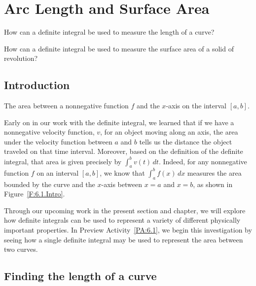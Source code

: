 \section{Arc Length and Surface Area} \label{S:6.3.ArcLength}

\begin{goals}
\item How can a definite integral be used to measure the length of a curve?
\item How can a definite integral be used to measure the surface area of a solid of revolution?
\end{goals}

\subsection*{Introduction}

\begin{marginfigure}[6cm] %
\caption{The area between a nonnegative function $f$ and the $x$-axis on the interval $[a,b]$.} \label{F:6.1.Intro}
\end{marginfigure}

Early on in our work with the definite integral, we learned that if we have a nonnegative velocity function, $v$, for an object moving along an axis, the area under the velocity function between $a$ and $b$ tells us the distance the object traveled on that time interval.  Moreover, based on the definition of the definite integral, that area is given precisely by $\int_a^b v(t) \, dt$.  Indeed, for any nonnegative function $f$ on an interval $[a,b]$, we know that $\int_a^b f(x) \, dx$ measures the area bounded by the curve and the $x$-axis between $x = a$ and $x = b$, as shown in Figure~\ref{F:6.1.Intro}.

Through our upcoming work in the present section and chapter, we will explore how definite integrals can be used to represent a variety of different physically important properties.  In Preview Activity~\ref{PA:6.1}, we begin this investigation by seeing how a single definite integral may be used to represent the area between two curves.


\subsection*{Finding the length of a curve} 

